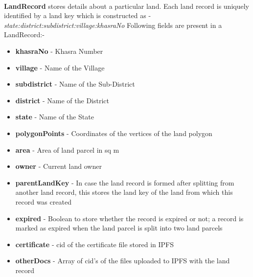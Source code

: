 \documentclass{article}
\begin{document}
        \paragraph{}
        \textbf{LandRecord} stores details about a particular land. Each land record is uniquely identified by a land key which is constructed as - 
        \textit{state:district:subdistrict:village:khasraNo}
        Following fields are present in a LandRecord:-
        \begin{itemize}
            \item \textbf{khasraNo} - Khasra Number
            \item \textbf{village} - Name of the Village
            \item \textbf{subdistrict} - Name of the Sub-District
            \item \textbf{district} - Name of the District
            \item \textbf{state} - Name of the State
            \item \textbf{polygonPoints} - Coordinates of the vertices of the land polygon
            \item \textbf{area} - Area of land parcel in sq m
            \item \textbf{owner} - Current land owner
            \item \textbf{parentLandKey} - In case the land record is formed after splitting from another land record, this stores the land key of the land from which this record was created
            \item \textbf{expired} - Boolean to store whether the record is expired or not; a record is marked as expired when the land parcel is split into two land parcels
            \item \textbf{certificate} - \gls{cid} of the certificate file stored in IPFS
            \item \textbf{otherDocs} - Array of \gls{cid}'s of the files uploaded to IPFS with the land record
        \end{itemize}
\end{document}
